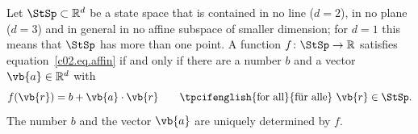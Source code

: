 \begin{lemma}\label{c02.lem.koordinaten}
  Let $\StSp \subset \mathbb{R}^d$ be a state space that is contained in no line ($d = 2$),
  in no plane ($d = 3$) and in general in no affine subspace of smaller dimension; for
  $d = 1$ this means that $\StSp$ has more than one point. A function
  $f\colon \StSp \to \mathbb{R}$ satisfies equation~\eqref{c02.eq.affin} if and only if
  there are a number $b$ and a vector $\vb{a} \in \mathbb{R}^d$ with
  \begin{equation}\label{c02.eq.koordinaten}
    f(\vb{r}) = b + \vb{a}\cdot\vb{r}
    \qquad \text{\tpcifenglish{for all}{für alle}}\ \vb{r} \in \StSp .
  \end{equation}
  The number $b$ and the vector $\vb{a}$ are uniquely determined by $f$.
\end{lemma}

